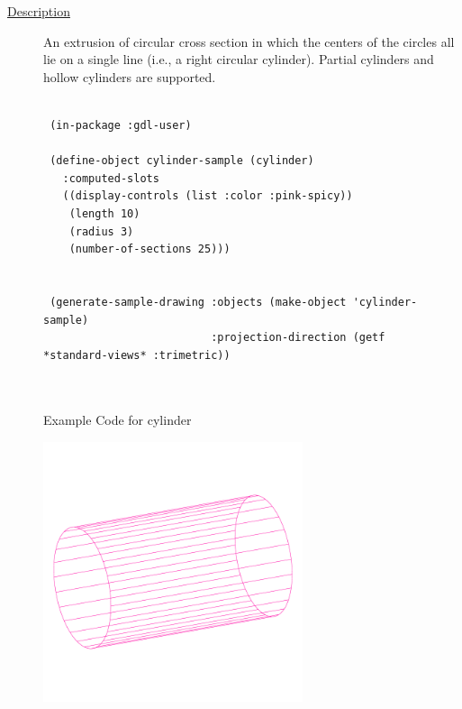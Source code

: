 \documentclass [11pt]{book}
\begin{document}
\begin{itemize}
\begin{description}
\item [
\underline{Description}]


An extrusion of circular cross section in which the 
centers of the circles all lie on a single line (i.e., a right circular cylinder).
Partial cylinders and hollow cylinders are supported.



\end{description}




\begin{figure}
\begin{lrbox}{\boxedverb}
\begin{minipage}{\linewidth}
{\small

\begin{verbatim}

 (in-package :gdl-user)

 (define-object cylinder-sample (cylinder)
   :computed-slots
   ((display-controls (list :color :pink-spicy))
    (length 10)
    (radius 3)
    (number-of-sections 25)))


 (generate-sample-drawing :objects (make-object 'cylinder-sample)
                          :projection-direction (getf *standard-views* :trimetric))
   


\end{verbatim}}
\end{minipage}
\end{lrbox}
\fbox{\usebox{\boxedverb}}

\caption{Example Code for cylinder}

\label{fig:example-code-cylinder}

\end{figure}

\begin{figure}
\begin{center}
\includegraphics[width=3in,height=3in]{../images/example-cylinder.pdf}
\end{center}


\end{figure}
\end{itemize}
\end{document}
